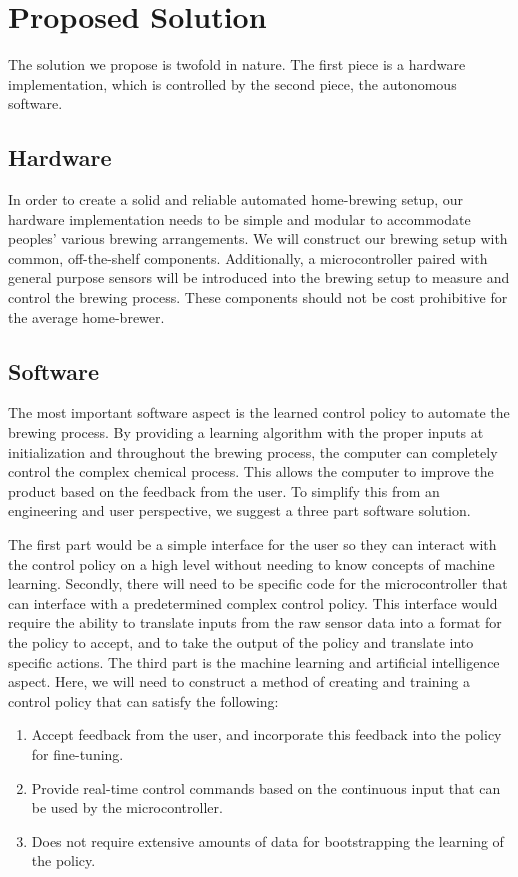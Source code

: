 \documentclass[letterpaper,10pt]{article}
\begin{document}
\section{Proposed Solution}
The solution we propose is twofold in nature.
The first piece is a hardware implementation, which is controlled by the second piece, 
the autonomous software.

\subsection{Hardware}
In order to create a solid and reliable automated home-brewing setup, our hardware 
implementation needs to be simple and modular to accommodate peoples' various brewing arrangements.
We will construct our brewing setup with common, off-the-shelf components.
Additionally, a microcontroller paired with general purpose sensors will be 
introduced into the brewing setup to measure and control the brewing process.
These components should not be cost prohibitive for the average home-brewer.

\subsection{Software}
The most important software aspect is the learned control policy 
to automate the brewing process. By providing a learning algorithm with the proper 
inputs at initialization and throughout the brewing process, the computer can completely 
control the complex chemical process. This allows the computer to improve the product 
based on the feedback from the user. To simplify this from an engineering and user 
perspective, we suggest a three part software solution.

The first part would be a simple interface for the user so they can 
interact with the control policy on a high level without needing to know concepts of 
machine learning. Secondly, there will need to be specific code for the microcontroller 
that can interface with a predetermined complex control policy. This interface would 
require the ability to translate inputs from the raw sensor data into a format for 
the policy to accept, and to take the  output of the policy and translate into specific 
actions. The third part is the machine learning and artificial intelligence aspect.
Here, we will need to construct a method of creating and training a control policy 
that can satisfy the following:

\begin{enumerate}
	\item Accept feedback from the user, and incorporate this feedback into the 
		policy for fine-tuning.
	\item Provide real-time control commands based on the continuous input that 
		can be used by the microcontroller.
	\item Does not require extensive amounts of data for bootstrapping the learning 
		of the policy.
\end{enumerate}
\end{document}
